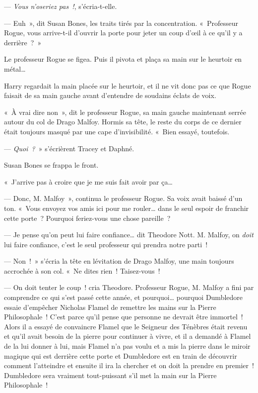 --- \emph{Vous n'oseriez pas~!}, s'écria-t-elle.

--- Euh~», dit Susan Bones, les traits tirés par la concentration.
«~Professeur Rogue, vous arrive-t-il d'ouvrir la porte pour jeter un coup d'œil à ce qu'il y a derrière~?~»

Le professeur Rogue se figea.
Puis il pivota et plaça sa main sur le heurtoir en métal…

Harry regardait la main placée sur le heurtoir, et il ne vit donc pas ce que Rogue faisait de sa main gauche avant d'entendre de soudains éclats de voix.

«~À vrai dire non~», dit le professeur Rogue, sa main gauche maintenant serrée autour du col de Drago Malfoy.
Hormis sa tête, le reste du corps de ce dernier était toujours masqué par une cape d'invisibilité.
«~Bien essayé, toutefois.

--- \emph{Quoi~?}~» s'écrièrent Tracey et Daphné.

Susan Bones se frappa le front.

«~J'arrive pas à croire que je me suis fait avoir par ça…

--- Donc, M. Malfoy~», continua le professeur Rogue.
Sa voix avait baissé d'un ton.
«~Vous envoyez vos amis ici pour me rouler… dans le seul espoir de franchir cette porte~?
Pourquoi feriez-vous une chose pareille~?

--- Je pense qu'on peut lui faire confiance… dit Theodore Nott.
M. Malfoy, on \emph{doit} lui faire confiance, c'est le seul professeur qui prendra notre parti~!

--- Non~!~»
s'écria la tête en lévitation de Drago Malfoy, une main toujours accrochée à son col.
«~Ne dites rien~!
Taisez-vous~!

--- On doit tenter le coup~! cria Theodore.
Professeur Rogue, M. Malfoy a fini par comprendre ce qui s'est passé cette année, et pourquoi… pourquoi Dumbledore essaie d'empêcher Nicholas Flamel de remettre les mains sur la Pierre Philosophale~!
C'est parce qu'il pense que personne ne devrait être immortel~!
Alors il a essayé de convaincre Flamel que le Seigneur des Ténèbres était revenu et qu'il avait besoin de la pierre pour continuer à vivre, et il a demandé à Flamel de la lui donner à lui, mais Flamel n'a pas voulu et a mis la pierre dans le miroir magique qui est derrière cette porte et Dumbledore est en train de découvrir comment l'atteindre et ensuite il ira la chercher et on doit la prendre en premier~!
Dumbledore sera vraiment tout-puissant s'il met la main sur la Pierre Philosophale~!

